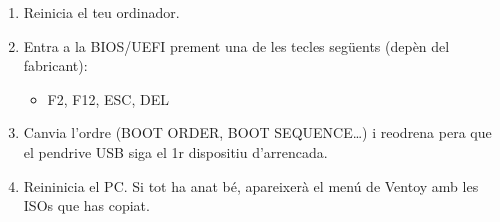 \documentclass[
  spanish,
  12 pt,
  a4paper,
]{article}
\providecommand{\tightlist}{%
  \setlength{\itemsep}{0pt}\setlength{\parskip}{0pt}}
\begin{document}
\begin{enumerate}
\def\labelenumi{\arabic{enumi}.}
\tightlist
\item
  Reinicia el teu ordinador.\\
\item
  Entra a la BIOS/UEFI prement una de les tecles següents (depèn del
  fabricant):

  \begin{itemize}
  \tightlist
  \item
    F2, F12, ESC, DEL\\
  \end{itemize}
\item
  Canvia l'ordre (BOOT ORDER, BOOT SEQUENCE\ldots) i reodrena pera que
  el pendrive USB siga el 1r dispositiu d'arrencada.
\item
  Reininicia el PC. Si tot ha anat bé, apareixerà el menú de Ventoy amb
  les ISOs que has copiat.
\end{enumerate}
\end{document}
